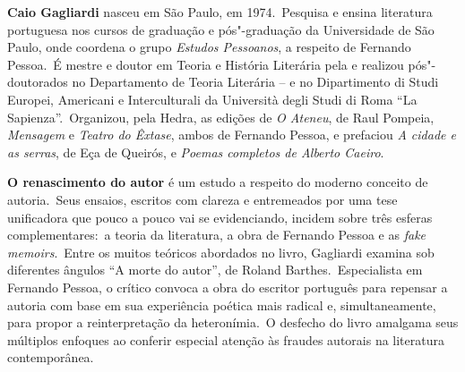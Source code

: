 
\textbf{Caio Gagliardi} nasceu em São Paulo, em 1974.~Pesquisa e ensina literatura portuguesa nos cursos de graduação e pós"-graduação da Universidade de São Paulo, onde coordena o grupo \emph{Estudos Pessoanos}, a respeito de Fernando Pessoa.~É mestre e doutor em Teoria e História Literária pela  e realizou pós"-doutorados no Departamento de Teoria Literária --  e no Dipartimento di Studi Europei, Americani e Interculturali da Università degli Studi di Roma ``La Sapienza''.~Organizou, pela Hedra, as edições de \emph{O Ateneu}, de Raul Pompeia, \emph{Mensagem} e \emph{Teatro do Êxtase}, ambos de Fernando Pessoa, e prefaciou \emph{A cidade e as serras}, de Eça de Queirós, e \emph{Poemas completos de Alberto Caeiro}.


\textbf{O renascimento do autor} é um estudo a respeito do moderno conceito de autoria.~Seus ensaios, escritos com clareza e entremeados por uma tese unificadora que pouco a pouco vai se evidenciando, incidem sobre três esferas complementares:~a teoria da literatura, a obra de Fernando Pessoa e as \emph{fake memoirs}.~Entre os muitos teóricos abordados no livro, Gagliardi examina sob diferentes ângulos ``A morte do autor'', de Roland Barthes.~Especialista em Fernando Pessoa, o crítico convoca a obra do escritor português para repensar a autoria com base em sua experiência poética mais radical e, simultaneamente, para propor a reinterpretação da heteronímia.~O desfecho do livro amalgama seus múltiplos enfoques ao conferir especial atenção às fraudes autorais na literatura contemporânea.

